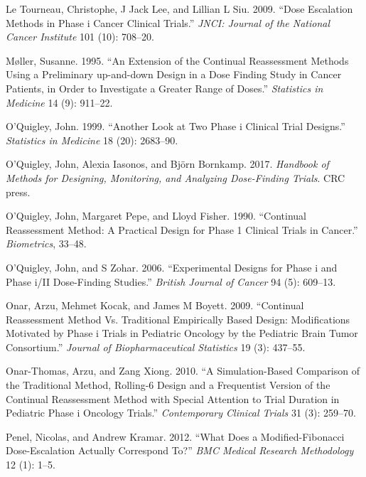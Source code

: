 \documentclass[
]{article}
\newlength{\cslhangindent}
\newlength{\cslentryspacingunit} %
\newenvironment{CSLReferences}[2] %
 {%
  \setlength{\parindent}{0pt}
  \ifodd #1
  \let\oldpar\par
  \def\par{\hangindent=\cslhangindent\oldpar}
  \fi
  \setlength{\parskip}{#2\cslentryspacingunit}
 }%
 {}
\begin{document}
\begin{CSLReferences}{1}{0}
\leavevmode{}%
Le Tourneau, Christophe, J Jack Lee, and Lillian L Siu. 2009. {``Dose
Escalation Methods in Phase i Cancer Clinical Trials.''} \emph{JNCI:
Journal of the National Cancer Institute} 101 (10): 708--20.

\leavevmode{}%
Møller, Susanne. 1995. {``An Extension of the Continual Reassessment
Methods Using a Preliminary up-and-down Design in a Dose Finding Study
in Cancer Patients, in Order to Investigate a Greater Range of Doses.''}
\emph{Statistics in Medicine} 14 (9): 911--22.

\leavevmode{}%
O'Quigley, John. 1999. {``Another Look at Two Phase i Clinical Trial
Designs.''} \emph{Statistics in Medicine} 18 (20): 2683--90.

\leavevmode{}%
O'Quigley, John, Alexia Iasonos, and Björn Bornkamp. 2017.
\emph{Handbook of Methods for Designing, Monitoring, and Analyzing
Dose-Finding Trials}. CRC press.

\leavevmode{}%
O'Quigley, John, Margaret Pepe, and Lloyd Fisher. 1990. {``Continual
Reassessment Method: A Practical Design for Phase 1 Clinical Trials in
Cancer.''} \emph{Biometrics}, 33--48.

\leavevmode{}%
O'Quigley, John, and S Zohar. 2006. {``Experimental Designs for Phase i
and Phase i/II Dose-Finding Studies.''} \emph{British Journal of Cancer}
94 (5): 609--13.

\leavevmode{}%
Onar, Arzu, Mehmet Kocak, and James M Boyett. 2009. {``Continual
Reassessment Method Vs. Traditional Empirically Based Design:
Modifications Motivated by Phase i Trials in Pediatric Oncology by the
Pediatric Brain Tumor Consortium.''} \emph{Journal of Biopharmaceutical
Statistics} 19 (3): 437--55.

\leavevmode{}%
Onar-Thomas, Arzu, and Zang Xiong. 2010. {``A Simulation-Based
Comparison of the Traditional Method, Rolling-6 Design and a Frequentist
Version of the Continual Reassessment Method with Special Attention to
Trial Duration in Pediatric Phase i Oncology Trials.''}
\emph{Contemporary Clinical Trials} 31 (3): 259--70.

\leavevmode{}%
Penel, Nicolas, and Andrew Kramar. 2012. {``What Does a
Modified-Fibonacci Dose-Escalation Actually Correspond To?''} \emph{BMC
Medical Research Methodology} 12 (1): 1--5.


\end{CSLReferences}
\end{document}
